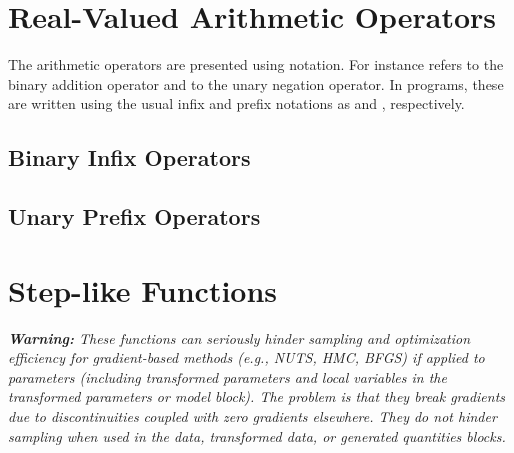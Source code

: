 \section{Real-Valued Arithmetic Operators}\label{real-valued-arithmetic-operators.section}

The arithmetic operators are presented using \Cpp notation.  For
instance  refers to the binary addition operator
and  to the unary negation operator.  In \Stan
programs, these are written using the usual infix and prefix notations
as  and , respectively.

\subsection{Binary Infix Operators}

\begin{description}
%
%
%
%
%
\end{description}

\subsection{Unary Prefix Operators}

\begin{description}

\end{description}


\section{Step-like Functions}\label{step-functions.section}

{\it {\bf Warning:} These functions can seriously hinder sampling and
  optimization efficiency for gradient-based methods (e.g., NUTS, HMC,
  BFGS) if applied to parameters (including transformed parameters and
  local variables in the transformed parameters or model block).  The
  problem is that they break gradients due to discontinuities coupled with
  zero gradients elsewhere.  They do not hinder sampling when used in the
  data, transformed data, or generated quantities blocks.}

